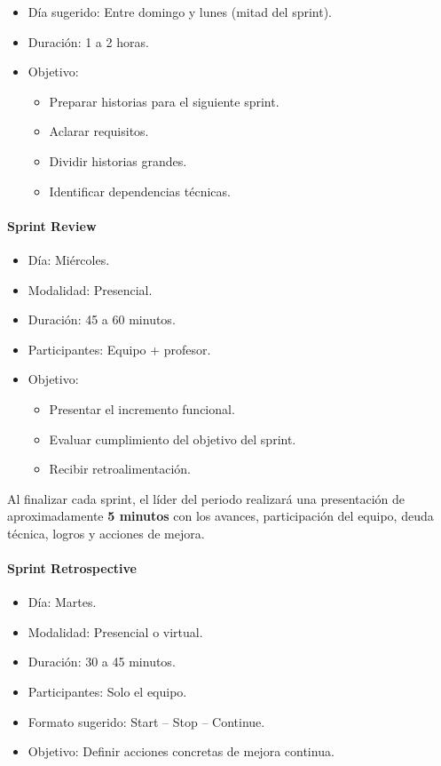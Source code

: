 \documentclass[12pt]{article}
\begin{document}
\begin{itemize}
    \item Día sugerido: Entre domingo y lunes (mitad del sprint).
    \item Duración: 1 a 2 horas.
    \item Objetivo:
    \begin{itemize}
        \item Preparar historias para el siguiente sprint.
        \item Aclarar requisitos.
        \item Dividir historias grandes.
        \item Identificar dependencias técnicas.
    \end{itemize}
\end{itemize}

\paragraph{Sprint Review}

\begin{itemize}
    \item Día: Miércoles.
    \item Modalidad: Presencial.
    \item Duración: 45 a 60 minutos.
    \item Participantes: Equipo + profesor.
    \item Objetivo:
    \begin{itemize}
        \item Presentar el incremento funcional.
        \item Evaluar cumplimiento del objetivo del sprint.
        \item Recibir retroalimentación.
    \end{itemize}
\end{itemize}

Al finalizar cada sprint, el líder del periodo realizará una presentación de aproximadamente \textbf{5 minutos} con los avances, participación del equipo, deuda técnica, logros y acciones de mejora.

\paragraph{Sprint Retrospective}

\begin{itemize}
    \item Día: Martes.
    \item Modalidad: Presencial o virtual.
    \item Duración: 30 a 45 minutos.
    \item Participantes: Solo el equipo.
    \item Formato sugerido: Start -- Stop -- Continue.
    \item Objetivo: Definir acciones concretas de mejora continua.
\end{itemize}
\end{document}
